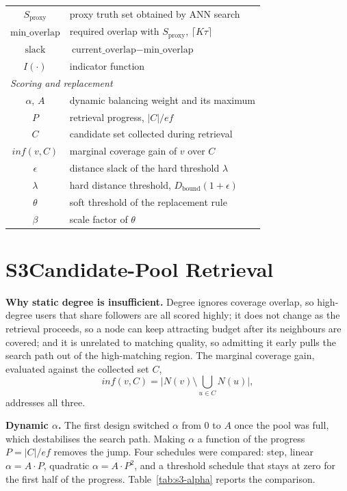 \documentclass[conference]{IEEEtran}
\begin{document}
\begin{table}[h]
\begin{center}
\begin{tabular}{|c|l|}
$S_{\text{proxy}}$ & proxy truth set obtained by ANN search \\
$\text{min\_overlap}$ & required overlap with $S_{\text{proxy}}$, $\lceil K\tau\rceil$ \\
$\text{slack}$ & $\text{current\_overlap}-\text{min\_overlap}$ \\
$I(\cdot)$ & indicator function \\
\hline
\multicolumn{2}{|l|}{\textit{Scoring and replacement}} \\
\hline
$\alpha$, $A$ & dynamic balancing weight and its maximum \\
$P$ & retrieval progress, $|C|/\mathit{ef}$ \\
$C$ & candidate set collected during retrieval \\
$\mathit{inf}(v,C)$ & marginal coverage gain of $v$ over $C$ \\
$\epsilon$ & distance slack of the hard threshold $\lambda$ \\
$\lambda$ & hard distance threshold, $D_{\text{bound}}(1+\epsilon)$ \\
$\theta$ & soft threshold of the replacement rule \\
$\beta$ & scale factor of $\theta$ \\
\hline
\end{tabular}
\end{center}
\end{table}

\section*{S3\quad Candidate-Pool Retrieval}
\label{sec:s3}

\textbf{Why static degree is insufficient.} Degree ignores coverage overlap, so
high-degree users that share followers are all scored highly; it does not change
as the retrieval proceeds, so a node can keep attracting budget after its
neighbours are covered; and it is unrelated to matching quality, so admitting it
early pulls the search path out of the high-matching region. The marginal
coverage gain, evaluated against the collected set $C$,
\begin{equation}
\mathit{inf}(v,C)=\Big|N(v)\setminus\bigcup_{u\in C}N(u)\Big|,
\end{equation}
addresses all three.

\textbf{Dynamic $\alpha$.} The first design switched $\alpha$ from $0$ to $A$
once the pool was full, which destabilises the search path. Making $\alpha$ a
function of the progress $P=|C|/\mathit{ef}$ removes the jump. Four schedules
were compared: step, linear $\alpha=A\cdot P$, quadratic $\alpha=A\cdot P^{2}$,
and a threshold schedule that stays at zero for the first half of the progress.
Table~\ref{tab:s3-alpha} reports the comparison.
\end{document}
